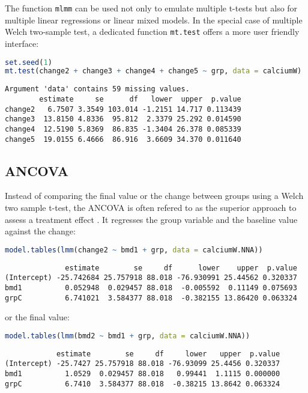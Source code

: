 \documentclass[12pt]{article}
\begin{document}
The function \texttt{mlmm} can be used not only to emulate multiple t-tests
but also for multiple linear regressions or linear mixed models. In
the special case of multiple Welch two-sample test, a dedicated
function \texttt{mt.test} offers a more user friendly interface:
\begin{lstlisting}[language=r,numbers=none]
set.seed(1)
mt.test(change2 + change3 + change4 + change5 ~ grp, data = calciumW)
\end{lstlisting}

\label{}
\begin{verbatim}
Argument 'data' contains 59 missing values. 
        estimate     se      df   lower  upper  p.value
change2   6.7507 3.3549 103.014 -1.2151 14.717 0.113439
change3  13.8150 4.8336  95.812  2.3379 25.292 0.014590
change4  12.5190 5.8369  86.835 -1.3404 26.378 0.085339
change5  19.0155 6.4666  86.916  3.6609 34.370 0.011640
\end{verbatim}


\clearpage
\subsection{ANCOVA}
\label{sec:orgb3b8d27}

Instead of comparing the final value or the change between groups
using a Welch two sample t-test, the ANCOVA is often refered to as the
superior approach to assess a treatment effect
\citep{vickers2001analysing}. It regresses the group variable and the
baseline value against the change:

\begin{lstlisting}[language=r,numbers=none]
model.tables(lmm(change2 ~ bmd1 + grp, data = calciumW.NNA))
\end{lstlisting}

\label{}
\begin{verbatim}
              estimate        se     df      lower    upper  p.value
(Intercept) -25.742684 25.757918 88.018 -76.930991 25.44562 0.320337
bmd1          0.052948  0.029457 88.018  -0.005592  0.11149 0.075693
grpC          6.741021  3.584377 88.018  -0.382155 13.86420 0.063324
\end{verbatim}


or the final value:
\begin{lstlisting}[language=r,numbers=none]
model.tables(lmm(bmd2 ~ bmd1 + grp, data = calciumW.NNA))
\end{lstlisting}

\label{}
\begin{verbatim}
            estimate        se     df     lower   upper  p.value
(Intercept) -25.7427 25.757918 88.018 -76.93099 25.4456 0.320337
bmd1          1.0529  0.029457 88.018   0.99441  1.1115 0.000000
grpC          6.7410  3.584377 88.018  -0.38215 13.8642 0.063324
\end{verbatim}
\end{document}

